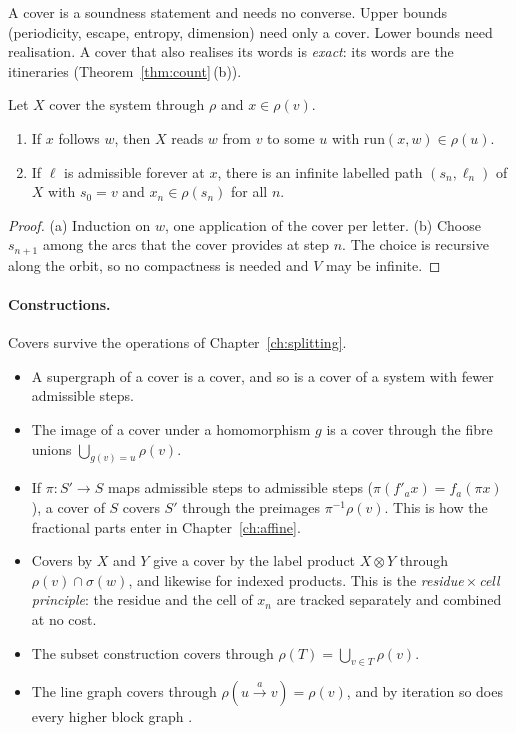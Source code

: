 A cover is a soundness statement and needs no converse. Upper bounds (periodicity, escape,
entropy, dimension) need only a cover. Lower bounds need realisation. A cover that also
realises its words is \emph{exact}: its words are the itineraries
(Theorem~\ref{thm:count}\,(b)).

\begin{proposition}[shadowing]\label{prop:shadow}
Let \(X\) cover the system through \(\rho\) and \(x\in\rho(v)\).
\begin{enumerate}[label=(\alph*)]
\item If \(x\) follows \(w\), then \(X\) reads \(w\) from \(v\) to some \(u\) with
  \(\mathrm{run}(x,w)\in\rho(u)\).
\item If \(\ell\) is admissible forever at \(x\), there is an infinite labelled path
  \((s_n,\ell_n)\) of \(X\) with \(s_0=v\) and \(x_n\in\rho(s_n)\) for all \(n\).
\end{enumerate}
\end{proposition}

\begin{proof}
(a) Induction on \(w\), one application of the cover per letter. (b) Choose \(s_{n+1}\) among
the arcs that the cover provides at step \(n\). The choice is recursive along the orbit, so no
compactness is needed and \(V\) may be infinite.
\end{proof}

\paragraph{Constructions.} Covers survive the operations of Chapter~\ref{ch:splitting}.
\begin{itemize}
\item A supergraph of a cover is a cover, and so is a cover of a system with fewer admissible
  steps.
\item The image of a cover under a homomorphism \(g\) is a cover through the fibre unions
  \(\bigcup_{g(v)=u}\rho(v)\).
\item If \(\pi\colon S'\to S\) maps admissible steps to admissible steps
  (\(\pi(f'_a x)=f_a(\pi x)\)), a cover of \(S\) covers \(S'\) through the preimages
  \(\pi^{-1}\rho(v)\). This is how the fractional parts enter in Chapter~\ref{ch:affine}.
\item Covers by \(X\) and \(Y\) give a cover by the label product \(X\otimes Y\) through
  \(\rho(v)\cap\sigma(w)\), and likewise for indexed products. This is the
  \emph{residue\,\(\times\)\,cell principle}: the residue and the cell of \(x_n\) are tracked
  separately and combined at no cost.
\item The subset construction covers through \(\rho(T)=\bigcup_{v\in T}\rho(v)\).
\item The line graph covers through \(\rho(u\xrightarrow{a}v)=\rho(v)\), and by iteration so does
  every higher block graph \cite[§2.3]{LM95}.
\end{itemize}

